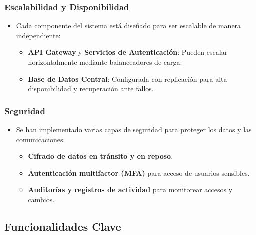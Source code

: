 \documentclass{article}
\begin{document}
\subsubsection{Escalabilidad y Disponibilidad}
\begin{itemize}
    \item Cada componente del sistema está diseñado para ser escalable de manera independiente:
          \begin{itemize}
              \item \textbf{API Gateway} y \textbf{Servicios de Autenticación}: Pueden escalar horizontalmente mediante balanceadores de carga.
              \item \textbf{Base de Datos Central}: Configurada con replicación para alta disponibilidad y recuperación ante fallos.
          \end{itemize}
\end{itemize}

\subsubsection{Seguridad}
\begin{itemize}
    \item Se han implementado varias capas de seguridad para proteger los datos y las comunicaciones:
          \begin{itemize}
              \item \textbf{Cifrado de datos en tránsito y en reposo}.
              \item \textbf{Autenticación multifactor (MFA)} para acceso de usuarios sensibles.
              \item \textbf{Auditorías y registros de actividad} para monitorear accesos y cambios.
          \end{itemize}
\end{itemize}

\subsection{Funcionalidades Clave}
\end{document}

